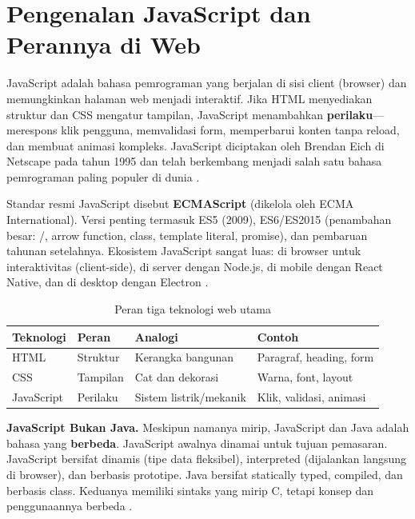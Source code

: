 \section{Pengenalan JavaScript dan Perannya di Web}

JavaScript adalah bahasa pemrograman yang berjalan di sisi client (browser) dan memungkinkan halaman web menjadi interaktif. Jika HTML menyediakan struktur dan CSS mengatur tampilan, JavaScript menambahkan \textbf{perilaku}---merespons klik pengguna, memvalidasi form, memperbarui konten tanpa reload, dan membuat animasi kompleks. JavaScript diciptakan oleh Brendan Eich di Netscape pada tahun 1995 dan telah berkembang menjadi salah satu bahasa pemrograman paling populer di dunia \cite{jsInfo}.

Standar resmi JavaScript disebut \textbf{ECMAScript} (dikelola oleh ECMA International). Versi penting termasuk ES5 (2009), ES6/ES2015 (penambahan besar: /, arrow function, class, template literal, promise), dan pembaruan tahunan setelahnya. Ekosistem JavaScript sangat luas: di browser untuk interaktivitas (client-side), di server dengan Node.js, di mobile dengan React Native, dan di desktop dengan Electron \cite{mdnJsGuide}.

\begin{table}[htbp]
\centering
\begin{tabular}{|P{2cm}|P{3cm}|P{3.5cm}|P{3.5cm}|}
\hline
\textbf{Teknologi} & \textbf{Peran} & \textbf{Analogi} & \textbf{Contoh} \\
\hline
HTML & Struktur & Kerangka bangunan & Paragraf, heading, form \\
\hline
CSS & Tampilan & Cat dan dekorasi & Warna, font, layout \\
\hline
JavaScript & Perilaku & Sistem listrik/mekanik & Klik, validasi, animasi \\
\hline
\end{tabular}
\caption{Peran tiga teknologi web utama}
\end{table}

\begin{konsep}
\textbf{JavaScript Bukan Java.} Meskipun namanya mirip, JavaScript dan Java adalah bahasa yang \textbf{berbeda}. JavaScript awalnya dinamai untuk tujuan pemasaran. JavaScript bersifat dinamis (tipe data fleksibel), interpreted (dijalankan langsung di browser), dan berbasis prototipe. Java bersifat statically typed, compiled, dan berbasis class. Keduanya memiliki sintaks yang mirip C, tetapi konsep dan penggunaannya berbeda \cite{jsInfo}.
\end{konsep}

